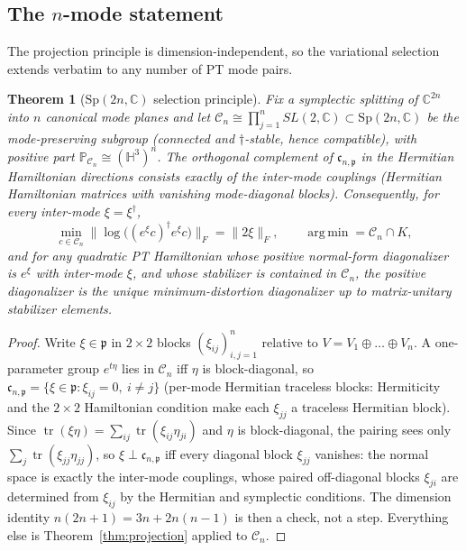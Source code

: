 \documentclass[11pt]{article}
\newtheorem{theorem}{Theorem}[section]
\theoremstyle{definition}
\theoremstyle{remark}
\newcommand{\C}{\mathbb{C}}
\newcommand{\Sp}{\mathrm{Sp}}
\newcommand{\tr}{\operatorname{tr}}
\newcommand{\dg}{\dagger}
\begin{document}
\subsection{The $n$-mode statement}\label{ssec:nmode}

The projection principle is dimension-independent, so the variational
selection extends verbatim to any number of PT mode pairs.

\begin{theorem}[$\Sp(2n,\C)$ selection principle]\label{thm:nmode}
Fix a symplectic splitting of $\C^{2n}$ into $n$ canonical mode planes and
let $\mathcal C_n\cong\prod_{j=1}^{n}SL(2,\C)\subset\Sp(2n,\C)$ be the
mode-preserving subgroup (connected and $\dg$-stable, hence compatible),
with positive part $\mathbb P_{\mathcal C_n}\cong(\mathbb H^3)^{n}$.  The orthogonal complement
of $\mathfrak c_{n,\mathfrak p}$ in the Hermitian Hamiltonian directions
consists exactly of the \emph{inter-mode} couplings (Hermitian Hamiltonian
matrices with vanishing mode-diagonal blocks).  Consequently, for every
inter-mode $\xi=\xi^{\dg}$,
\begin{equation}
\min_{c\in\mathcal C_n}
\big\|\log\big((e^{\xi}c)^{\dg}e^{\xi}c\big)\big\|_F=\|2\xi\|_F,
\qquad
\operatorname*{arg\,min}=\mathcal C_n\cap K,
\end{equation}
and for any quadratic PT Hamiltonian whose positive normal-form
diagonalizer is $e^{\xi}$ with inter-mode $\xi$, and whose stabilizer is
contained in $\mathcal C_n$, the positive diagonalizer is the unique
minimum-distortion diagonalizer up to matrix-unitary stabilizer elements.
\end{theorem}

\begin{proof}
Write $\xi\in\mathfrak p$ in $2\times2$ blocks $(\xi_{ij})_{i,j=1}^{n}$
relative to $V=V_1\oplus\dots\oplus V_n$.  A one-parameter group
$e^{t\eta}$ lies in $\mathcal C_n$ iff $\eta$ is block-diagonal, so
$\mathfrak c_{n,\mathfrak p}=\{\xi\in\mathfrak p:\xi_{ij}=0,\ i\neq j\}$
(per-mode Hermitian traceless blocks: Hermiticity and the $2\times2$
Hamiltonian condition make each $\xi_{jj}$ a traceless Hermitian block).
Since $\tr(\xi\eta)=\sum_{ij}\tr(\xi_{ij}\eta_{ji})$ and $\eta$ is
block-diagonal, the pairing sees only $\sum_j\tr(\xi_{jj}\eta_{jj})$, so
$\xi\perp\mathfrak c_{n,\mathfrak p}$ iff every diagonal block $\xi_{jj}$
vanishes: the normal space is exactly the inter-mode couplings, whose
paired off-diagonal blocks $\xi_{ji}$ are determined from $\xi_{ij}$ by the
Hermitian and symplectic conditions.  The dimension identity
$n(2n+1)=3n+2n(n-1)$ is then a check, not a step.  Everything else is
Theorem~\ref{thm:projection} applied to $\mathcal C_n$.
\end{proof}
\end{document}
